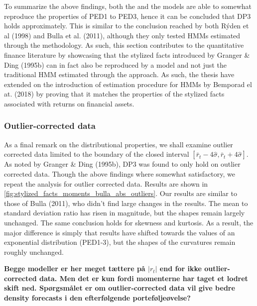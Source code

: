 To summarize the above findings, both the \mle and the \jump models are able to somewhat reproduce the properties of PED1 to PED3, hence it can be concluded that DP3 holds approximately. This is similar to the conclusion reached by both Rýden et al (1998) and Bulla et al. (2011), although they only tested HMMs estimated through the \mle methodology. As such, this section contributes to the quantitative finance literature by showcasing that the stylized facts introduced by Granger \& Ding (1995b) can in fact also be reproduced by a \jump model and not just the traditional HMM estimated through the \mle approach. As such, the thesis have extended on the introduction of \jump estimation procedure for HMMs by Bemporad el at. (2018) by proving that it matches the properties of the stylized facts associated with returns on financial assets.

\subsubsection{Outlier-corrected data}

As a final remark on the distributional properties, we shall examine outlier corrected data limited to the boundary of the closed interval $[\bar r_t - 4\hat\sigma, \bar r_t + 4\hat\sigma]$. As noted by Granger \& Ding (1995b), DP3 was found to only hold on outlier corrected data. Though the above findings where somewhat satisfactory, we repeat the analysis for outlier corrected data. Results are shown in \cref{fig:stylized_facts_moments_bulla_abs_outliers}. Our results are similar to those of Bulla (2011), who didn't find large changes in the results. The mean to standard deviation ratio has risen in magnitude, but the shapes remain largely unchanged. The same conclusion holds for skewness and kurtosis. As a result, the major difference is simply that results have shifted towards the values of an exponential distribution (PED1-3), but the shapes of the curvatures remain roughly unchanged.

\textbf{Begge modeller er her meget tættere på $|r_t|$ end for ikke outlier-corrected data. Men det er kun fordi momenterne har taget et lodret skift ned. Spørgsmålet er om outlier-corrected data vil give bedre density forecasts i den efterfølgende porteføljeøvelse?}

